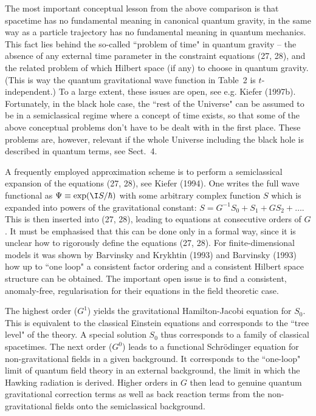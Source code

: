 The most important conceptual lesson from the above comparison
is that spacetime has no fundamental meaning in canonical quantum
gravity, in the same way as a particle trajectory has no 
fundamental meaning in quantum mechanics.
This fact lies behind the so-called ``problem of time" in quantum
gravity -- the absence of any external time parameter in the constraint
equations (27, 28), and the related problem of which Hilbert space
(if any) to choose in quantum gravity. (This is way the
quantum gravitational wave function in Table~2 is $t$-independent.)
 To a large extent, these issues
are open, see e.g. Kiefer (1997b). Fortunately, in the
black hole case, the ``rest of the Universe" can be assumed
to be in a semiclassical regime where a concept of time
exists, so that some of the above conceptual problems don't have
to be dealt with in the first place. These problems are, however,
relevant if the whole Universe including the black hole is described
in quantum terms, see Sect.~4.

A frequently employed approximation scheme is to perform a semiclassical
expansion of the equations (27, 28), see Kiefer (1994).
One writes the full wave functional as $\Psi\equiv\exp(\I S/\hbar)$
with some arbitrary complex function $S$ which is expanded into
powers of the gravitational constant: $S=G^{-1}S_0+S_1
+GS_2+\ldots$. This is then inserted into (27, 28), leading to
equations at consecutive orders of $G$. It must be emphasised that
this can be done only in a formal way, since it is unclear how 
to rigorously define the equations (27, 28). For finite-dimensional
models it was shown by Barvinsky and Krykhtin (1993) and Barvinsky
(1993) how up to ``one loop" a consistent factor ordering
and a consistent Hilbert space structure can be obtained.
The important open issue is to find a consistent, anomaly-free,
regularisation for their equations in the field theoretic case.

 The highest order ($G^1$)
yields the gravitational 
Hamilton-Jacobi equation for $S_0$. This is equivalent 
to the classical Einstein equations and corresponds to the
``tree level" of the theory. A special solution $S_0$ thus corresponds
to a family of classical spacetimes. 
The next order ($G^0$) leads to a functional Schr\"odinger equation
for non-gravitational fields in a given background. 
It corresponds to the ``one-loop"
 limit of quantum field theory in an external
background, the limit in which the Hawking radiation is derived.
Higher orders in $G$ then lead to genuine quantum gravitational
correction terms as well as back reaction terms from the
non-gravitational fields onto the semiclassical background.

